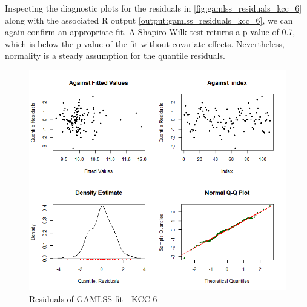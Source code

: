 Inspecting the diagnostic plots for the residuals in \autoref{fig:gamlss_residuals_kcc_6} along with the associated R output \ref{output:gamlss_residuals_kcc_6}, we can again confirm an appropriate fit. A Shapiro-Wilk test returns a p-value of 0.7, which is below the p-value of the fit without covariate effects. Nevertheless, normality is a steady assumption for the quantile residuals.
\\




\begin{figure}[H]
\centering
  \includegraphics[width=0.95\linewidth]{figures/gamlss_residuals_kcc_6.png}
  \caption{Residuals of GAMLSS fit - KCC 6}
  \label{fig:gamlss_residuals_kcc_6}
\end{figure}



















